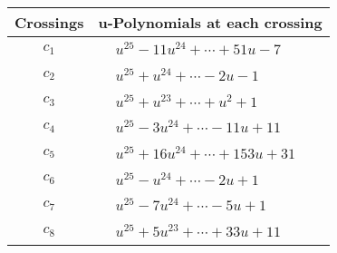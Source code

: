 \documentclass[1p]{elsarticle_modified}
\theoremstyle{definition}
\begin{document}
\begin{tabular}{m{50pt}|m{274pt}}
Crossings & \hspace{64pt}u-Polynomials at each crossing \\
\hline $$\begin{aligned}c_{1}\end{aligned}$$&$\begin{aligned}
&u^{25}-11 u^{24}+\cdots+51 u-7
\end{aligned}$\\
\hline $$\begin{aligned}c_{2}\end{aligned}$$&$\begin{aligned}
&u^{25}+u^{24}+\cdots-2 u-1
\end{aligned}$\\
\hline $$\begin{aligned}c_{3}\end{aligned}$$&$\begin{aligned}
&u^{25}+u^{23}+\cdots+u^2+1
\end{aligned}$\\
\hline $$\begin{aligned}c_{4}\end{aligned}$$&$\begin{aligned}
&u^{25}-3 u^{24}+\cdots-11 u+11
\end{aligned}$\\
\hline $$\begin{aligned}c_{5}\end{aligned}$$&$\begin{aligned}
&u^{25}+16 u^{24}+\cdots+153 u+31
\end{aligned}$\\
\hline $$\begin{aligned}c_{6}\end{aligned}$$&$\begin{aligned}
&u^{25}- u^{24}+\cdots-2 u+1
\end{aligned}$\\
\hline $$\begin{aligned}c_{7}\end{aligned}$$&$\begin{aligned}
&u^{25}-7 u^{24}+\cdots-5 u+1
\end{aligned}$\\
\hline $$\begin{aligned}c_{8}\end{aligned}$$&$\begin{aligned}
&u^{25}+5 u^{23}+\cdots+33 u+11
\end{aligned}$\\

\end{tabular}
\end{document}
